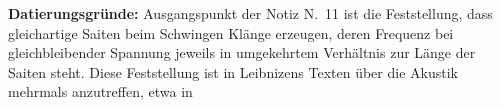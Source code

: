 \begin{ledgroup}
\footnotesize
\pstart
\noindent%
\textbf{Datierungsgründe:}
Ausgangspunkt der Notiz N.~11 ist die Feststellung, dass gleich\-ar\-ti\-ge Saiten beim Schwingen Klänge erzeugen, deren Frequenz bei gleichbleibender Spannung jeweils in umgekehrtem Ver\-hältnis zur Länge der Saiten steht.
%
Diese Feststellung ist in Leibnizens Texten über die Akustik mehrmals anzutreffen, etwa in

\end{ledgroup}
